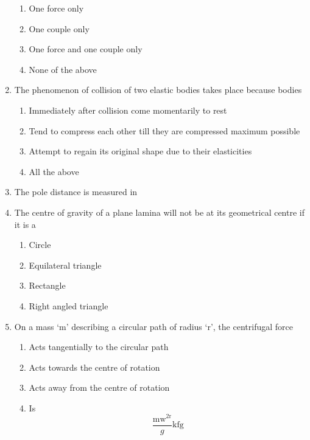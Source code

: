 \documentclass[11pt,a4paper]{article}
\begin{document}
\begin{enumerate}
\begin{enumerate}[label=\Alph*.]
\item{One force only}
\item{One couple only}
\item{One force and one couple only}
\item{None of the above}
\end{enumerate}
\item{The phenomenon of collision of two elastic bodies takes place because bodies}
\begin{enumerate}[label=\Alph*.]
\item{Immediately after collision come momentarily to rest}
\item{Tend to compress each other till they are compressed maximum possible}
\item{Attempt to regain its original shape due to their elasticities}
\item{All the above}
\end{enumerate}
\item{The pole distance is measured in}
\\
\item{The centre of gravity of a plane lamina will not be at its geometrical centre if it is a}
\begin{enumerate}[label=\Alph*.]
\item{Circle}
\item{Equilateral triangle}
\item{Rectangle}
\item{Right angled triangle}
\end{enumerate}
\item{On a mass `m' describing a circular path of radius `r', the centrifugal force
}
\begin{enumerate}[label=\Alph*.]
\item{Acts tangentially to the circular path}
\item{Acts towards the centre of rotation}
\item{Acts away from the centre of rotation}
\item{Is $$\frac{{{\text{m}}{{\text{w}}^{2{\text{r}}}}}}{g}{\text{kfg}}$$}
\end{enumerate}

\end{enumerate}
\end{document}
